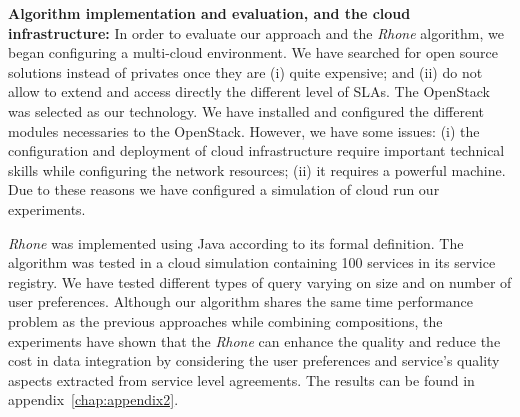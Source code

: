 \bigskip
\noindent \textbf{Algorithm implementation and evaluation, and the cloud infrastructure:}
In order to evaluate our approach and the \textit{Rhone} algorithm, we began configuring a multi-cloud environment. We have searched for open source solutions instead of privates once they are (i) quite expensive; and (ii) do not allow to extend and access directly the different level of SLAs. The OpenStack was selected as our technology. We have installed and configured the different modules necessaries to the OpenStack. However, we have some issues: (i) the configuration and deployment of cloud infrastructure require important technical skills while configuring the network resources; (ii) it requires a powerful machine. Due to these reasons we have configured a simulation of cloud run our experiments.

\textit{Rhone} was implemented using Java according to its formal definition. The algorithm was tested in a cloud simulation containing 100 services in its service registry. We have tested different types of query varying on size and on number of user preferences. Although our algorithm shares the same time performance problem as the previous approaches while combining compositions, the experiments have shown that the \textit{Rhone} can enhance the quality and reduce the cost in data integration by considering the user preferences and service's quality aspects extracted from service level agreements.
The results can be found in appendix~\ref{chap:appendix2}.
 



